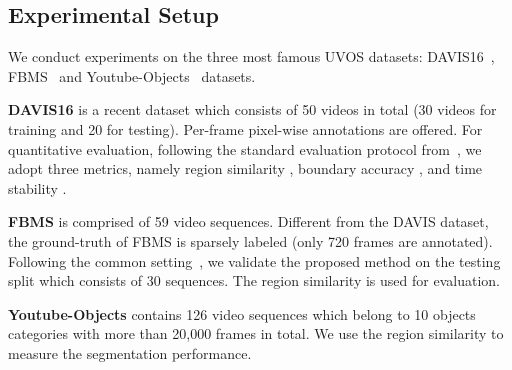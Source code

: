 \documentclass[10pt,twocolumn,letterpaper]{article}
\begin{document}
\subsection{Experimental Setup}\label{sec:expset}

We conduct experiments on the three most famous UVOS datasets: DAVIS16~\cite{perazzi2016benchmark}, FBMS~\cite{DBLP:journals/pami/OchsMB14} and Youtube-Objects~\cite{DBLP:conf/cvpr/PrestLCSF12} datasets.

\noindent\textbf{DAVIS16} is a recent dataset which consists of 50 videos in total (30 videos for training and 20 for testing). Per-frame pixel-wise annotations are offered.
For quantitative evaluation, following the standard evaluation protocol from~\cite{perazzi2016benchmark}, we adopt three metrics, namely region similarity , boundary accuracy , and time stability . 

\noindent\textbf{FBMS} is comprised of 59 video sequences. Different from the DAVIS dataset, the ground-truth of FBMS is sparsely labeled (only 720 frames are annotated).
Following the common setting~\cite{DBLP:conf/iccv/TokmakovAS17,DBLP:conf/cvpr/TokmakovAS17,DBLP:conf/cvpr/KohK17,Li_2018_CVPR,Li_2018_ECCV1,Song_2018_ECCV,cheng2017segflow},
we validate the proposed method on the testing split which consists of 30 sequences. The region similarity  is used for evaluation.

\noindent\textbf{Youtube-Objects} contains 126 video sequences which belong to 10 objects categories  with more than 20,000 frames in total. We use the region similarity  to measure the segmentation performance.
\end{document}
